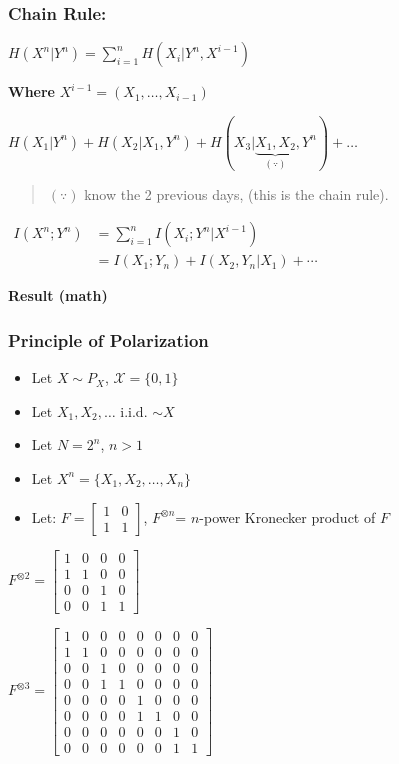 \documentclass[11pt]{article}
\begin{document}
\subsubsection{Chain Rule:}\label{chain-rule}

\(H(X^n | Y^n) = \sum\limits_{i=1}^n H(X_i | Y^n, X^{i-1})\)

\textbf{Where} \(X^{i-1} = (X_1, \dots, X_{i-1})\)

    \(H(X_1 | Y^n) + H(X_2 | X_1, Y^n) + H(X_3 | \underbrace{X_1, X_2}_{(\because)}, Y^n) + \dots\)

\begin{quote}
\((\because)\) know the 2 previous days, (this is the chain rule).
\end{quote}

\(\begin{align} I(X^n; Y^n) &= \sum\limits_{i=1}^n I(X_i; Y^n | X^{i-1}) \\ &= I(X_1; Y_n) + I(X_2, Y_n| X_1) + \cdots \end{align}\)

    \textbf{Result (math)}

\subsubsection{Principle of
Polarization}\label{principle-of-polarization}

\begin{itemize}
\item
  Let \(X \sim P_X\), \(\mathcal{X} = \{0, 1\}\)
\item
  Let \(X_1, X_2, \dots\) i.i.d. \(\sim X\)
\item
  Let \(N = 2^n\), \(n > 1\)
\item
  Let \(X^n = \{X_1, X_2, \dots, X_n\}\)
\item
  Let: \(F = \begin{bmatrix} 1 & 0 \\ 1 & 1 \end{bmatrix}\),
  \(F^{\otimes n}\)= \(n\)-power Kronecker product of \(F\)
\end{itemize}

\(F^{\otimes 2} = \begin{bmatrix} 1 & 0 & 0 & 0 \\ 1 & 1 & 0 & 0 \\ 0 & 0 & 1 & 0 \\ 0 & 0 & 1 & 1 \end{bmatrix}\)

\(F^{\otimes 3} = \begin{bmatrix} 1 & 0 & 0 & 0 & 0 & 0 & 0 & 0 \\ 1 & 1 & 0 & 0 & 0 & 0 & 0 & 0 \\ 0 & 0 & 1 & 0 & 0 & 0 & 0 & 0 \\ 0 & 0 & 1 & 1 & 0 & 0 & 0 & 0 \\ 0 & 0 & 0 & 0 & 1 & 0 & 0 & 0 \\ 0 & 0 & 0 & 0 & 1 & 1 & 0 & 0 \\ 0 & 0 & 0 & 0 & 0 & 0 & 1 & 0 \\ 0 & 0 & 0 & 0 & 0 & 0 & 1 & 1 \end{bmatrix}\)
\end{document}
